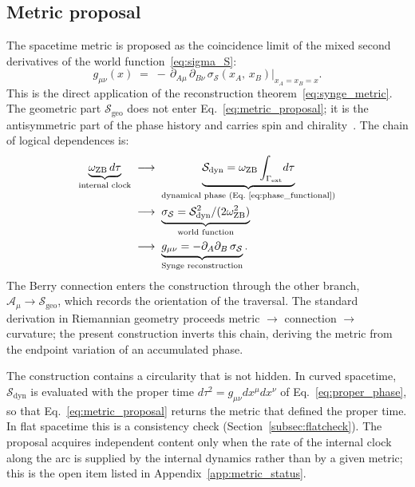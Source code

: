 \documentclass[%
 reprint, amsmath,amssymb, aps, prb, ]{revtex4-2}
\numberwithin{equation}{section}
\newcommand{\omZB}{\omega_{\text{ZB}}}
\begin{document}
\subsection{Metric proposal}

The spacetime metric is proposed as the coincidence limit of the mixed second derivatives of the world function~\eqref{eq:sigma_S}:
\begin{equation}
g_{\mu\nu}(x) \;=\; -\,\partial_{A\mu}\,\partial_{B\nu}\,\sigma_{\mathcal{S}}(x_A,\, x_B)\Big|_{x_A = x_B = x}.
\label{eq:metric_proposal}
\end{equation}
This is the direct application of the reconstruction theorem~\eqref{eq:synge_metric}. The geometric part $\mathcal{S}_{\mathrm{geo}}$ does not enter Eq.~\eqref{eq:metric_proposal}; it is the antisymmetric part of the phase history and carries spin and chirality~\cite{hanamura50}. The chain of logical dependences is:
\begin{align}
\underbrace{\omZB\,d\tau}_{\text{internal clock}}
&\;\longrightarrow\;
\underbrace{\mathcal{S}_{\mathrm{dyn}} = \omZB\int_{\Gamma_{\mathrm{ext}}}\!d\tau}_{\text{dynamical phase (Eq.~\ref{eq:phase_functional})}}
\notag\\
&\;\longrightarrow\;
\underbrace{\sigma_{\mathcal{S}} = \mathcal{S}_{\mathrm{dyn}}^2/(2\omZB^2)}_{\text{world function}}
\notag\\
&\;\longrightarrow\;
\underbrace{g_{\mu\nu} = -\partial_A\partial_B\,\sigma_{\mathcal{S}}}_{\text{Synge reconstruction}}.
\label{eq:gauge_to_geometry}
\end{align}
The Berry connection enters the construction through the other branch, $\mathcal{A}_\mu \to \mathcal{S}_{\mathrm{geo}}$, which records the orientation of the traversal. The standard derivation in Riemannian geometry proceeds metric $\to$ connection $\to$ curvature; the present construction inverts this chain, deriving the metric from the endpoint variation of an accumulated phase.

The construction contains a circularity that is not hidden. In curved spacetime, $\mathcal{S}_{\mathrm{dyn}}$ is evaluated with the proper time $d\tau^2 = g_{\mu\nu}dx^\mu dx^\nu$ of Eq.~\eqref{eq:proper_phase}, so that Eq.~\eqref{eq:metric_proposal} returns the metric that defined the proper time. In flat spacetime this is a consistency check (Section~\ref{subsec:flatcheck}). The proposal acquires independent content only when the rate of the internal clock along the arc is supplied by the internal dynamics rather than by a given metric; this is the open item listed in Appendix~\ref{app:metric_status}.
\end{document}
